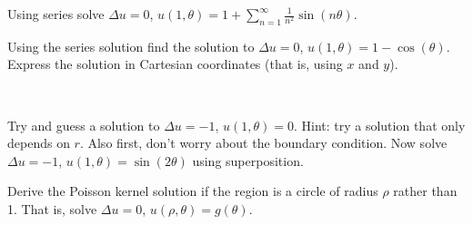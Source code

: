 \setcounter{exercise}{100}

\pagebreak[2]
\begin{exercise}
Using series solve
$\Delta u = 0$, $u(1,\theta) = 1+ \sum\limits_{n=1}^\infty \frac{1}{n^2}\sin(n\theta)$.
\end{exercise}

\begin{exercise}
Using the series solution find the solution to
$\Delta u = 0$, $u(1,\theta) = 1- \cos(\theta)$.  Express the solution
in Cartesian coordinates (that is, using $x$ and $y$).
\end{exercise}

\begin{exercise}
{\ }
\begin{tasks}
\task
Try and guess a solution to $\Delta u = -1$, $u(1,\theta) = 0$.
Hint: try a solution that only depends on $r$.  Also first, don't worry
about the boundary condition.
\task
Now solve $\Delta u = -1$, $u(1,\theta) = \sin(2\theta)$ using
superposition.
\end{tasks}
\end{exercise}

\begin{exercise}[challenging]
Derive the Poisson kernel solution
if the region is a circle of radius $\rho$ rather
than 1.  That is, solve $\Delta u = 0$, $u(\rho,\theta) = g(\theta)$.
\end{exercise}
